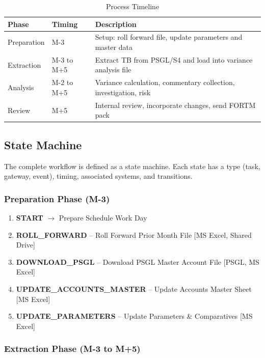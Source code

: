 \documentclass[11pt,a4paper]{article}
\begin{document}
\begin{table}[H]
\centering
\caption{Process Timeline}
\begin{tabularx}{\textwidth}{llX}
\toprule
\textbf{Phase} & \textbf{Timing} & \textbf{Description} \\
\midrule
Preparation  & M-3           & Setup: roll forward file, update parameters and master data \\
Extraction   & M-3 to M+5    & Extract TB from PSGL/S4 and load into variance analysis file \\
Analysis     & M-2 to M+5    & Variance calculation, commentary collection, investigation, risk \\
Review       & M+5           & Internal review, incorporate changes, send FORTM pack \\
\bottomrule
\end{tabularx}
\end{table}

\subsection{State Machine}

The complete workflow is defined as a state machine. Each state has a type (task, gateway, event), timing, associated systems, and transitions.

\subsubsection{Preparation Phase (M-3)}

\begin{enumerate}[nosep]
    \item \textbf{START} $\rightarrow$ Prepare Schedule Work Day
    \item \textbf{ROLL\_FORWARD} -- Roll Forward Prior Month File {\small [MS Excel, Shared Drive]}
    \item \textbf{DOWNLOAD\_PSGL} -- Download PSGL Master Account File {\small [PSGL, MS Excel]}
    \item \textbf{UPDATE\_ACCOUNTS\_MASTER} -- Update Accounts Master Sheet {\small [MS Excel]}
    \item \textbf{UPDATE\_PARAMETERS} -- Update Parameters \& Comparatives {\small [MS Excel]}
\end{enumerate}

\subsubsection{Extraction Phase (M-3 to M+5)}
\end{document}
